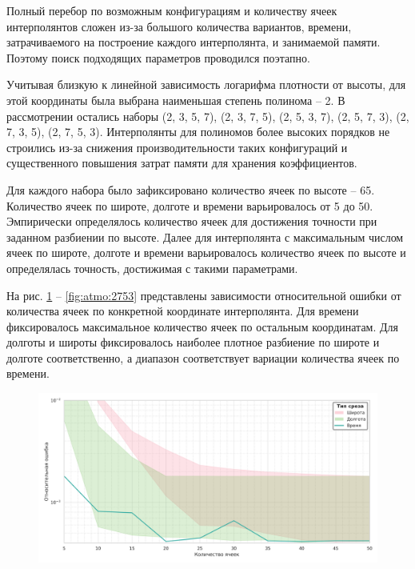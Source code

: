 Полный перебор по возможным конфигурациям и количеству ячеек интерполянтов сложен
из-за большого количества вариантов, времени, затрачиваемого на построение каждого интерполянта, и
занимаемой памяти. Поэтому поиск подходящих параметров проводился поэтапно.

Учитывая близкую к линейной зависимость логарифма плотности от высоты, для этой координаты
была выбрана наименьшая степень полинома -- 2. В рассмотрении остались наборы 
(2, 3, 5, 7), (2, 3, 7, 5), (2, 5, 3, 7), (2, 5, 7, 3), (2, 7, 3, 5),
(2, 7, 5, 3). Интерполянты для полиномов более
высоких порядков не строились из-за снижения производительности таких конфигураций и
существенного повышения затрат памяти для хранения коэффициентов.

Для каждого набора было зафиксировано количество ячеек по высоте -- 65. Количество ячеек
по широте, долготе и времени варьировалось от 5 до 50. Эмпирически определялось
количество ячеек для достижения точности при заданном разбиении по высоте. Далее
для интерполянта с максимальным числом ячеек по широте, долготе и времени варьировалось
количество ячеек по высоте и определялась точность, достижимая с такими параметрами.

На рис. \ref{fig:atmo:2357} -- \ref{fig:atmo:2753} представлены зависимости относительной ошибки от количества ячеек по
конкретной координате интерполянта. Для времени фиксировалось
максимальное количество ячеек по остальным координатам. Для долготы и широты
фиксировалось наиболее плотное разбиение по широте и долготе соответственно, а диапазон
соответствует вариации количества ячеек по времени.

\begin{figure}[h!]
    \centering
    \includegraphics[width=\linewidth]{../images/solution/atmo/2357.png}
    \label{fig:atmo:2357}
 \end{figure}

